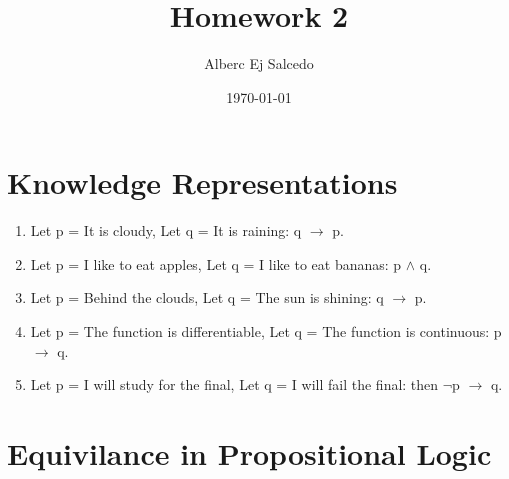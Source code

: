 \documentclass[11pt]{article}
\title{Homework 2}
\author{Alberc Ej Salcedo}
\date{\today}
\begin{document}
\maketitle

\section{Knowledge Representations}

\begin{enumerate}
\item Let p = It is cloudy, Let q = It is raining: q $\rightarrow$ p.
\item Let p = I like to eat apples, Let q =  I like to eat bananas: p $\wedge$ q.
\item Let p = Behind the clouds, Let q = The sun is shining: q $\rightarrow$ p.
\item Let p = The function is differentiable, Let q = The function is continuous: p $\rightarrow$ q.
\item Let p = I will study for the final, Let q = I will fail the final: then $\neg$p $\rightarrow$ q.
\end{enumerate}
\section{Equivilance in Propositional Logic}
\end{document}
